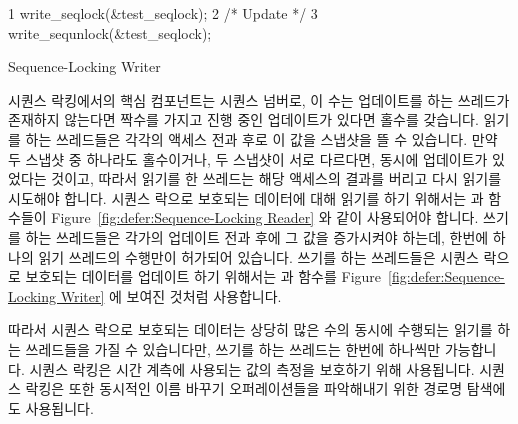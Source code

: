 \begin{listing}[bp]
{ \scriptsize
\begin{verbbox}
  1 write_seqlock(&test_seqlock);
  2 /* Update */
  3 write_sequnlock(&test_seqlock);
\end{verbbox}
}
\centering
\theverbbox
\caption{Sequence-Locking Writer}
\label{lst:defer:Sequence-Locking Writer}
\end{listing}

시퀀스 락킹에서의 핵심 컴포넌트는 시퀀스 넘버로, 이 수는 업데이트를 하는
쓰레드가 존재하지 않는다면 짝수를 가지고 진행 중인 업데이트가 있다면 홀수를
갖습니다.
읽기를 하는 쓰레드들은 각각의 액세스 전과 후로 이 값을 스냅샷을 뜰 수 있습니다.
만약 두 스냅샷 중 하나라도 홀수이거나, 두 스냅샷이 서로 다르다면, 동시에
업데이트가 있었다는 것이고, 따라서 읽기를 한 쓰레드는 해당 액세스의 결과를
버리고 다시 읽기를 시도해야 합니다.
시퀀스 락으로 보호되는 데이터에 대해 읽기를 하기 위해서는 
과  함수들이 Figure~\ref{fig:defer:Sequence-Locking Reader}
와 같이 사용되어야 합니다.
쓰기를 하는 쓰레드들은 각가의 업데이트 전과 후에 그 값을 증가시켜야 하는데,
한번에 하나의 읽기 쓰레드의 수행만이 허가되어 있습니다.
쓰기를 하는 쓰레드들은 시퀀스 락으로 보호되는 데이터를 업데이트 하기 위해서는
 과  함수를
Figure~\ref{fig:defer:Sequence-Locking Writer} 에 보여진 것처럼 사용합니다.

따라서 시퀀스 락으로 보호되는 데이터는 상당히 많은 수의 동시에 수행되는 읽기를
하는 쓰레드들을 가질 수 있습니다만, 쓰기를 하는 쓰레드는 한번에 하나씩만
가능합니다.
시퀀스 락킹은 시간 계측에 사용되는 값의 측정을 보호하기 위해 사용됩니다.
시퀀스 락킹은 또한 동시적인 이름 바꾸기 오퍼레이션들을 파악해내기 위한 경로명
탐색에도 사용됩니다.
\iffalse

